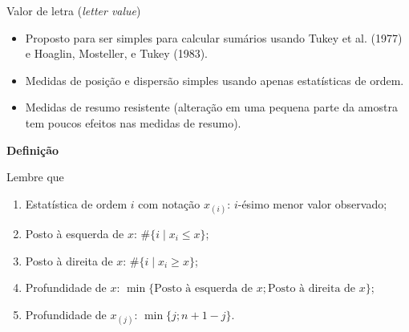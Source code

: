 \documentclass[
  10pt,
  ignorenonframetext,
]{beamer}
\providecommand{\tightlist}{%
  \setlength{\itemsep}{0pt}\setlength{\parskip}{0pt}}\usepackage{longtable,booktabs,array}
\begin{document}
\begin{frame}{Valor de letra (\emph{letter value})}
\protect\hypertarget{valor-de-letra-letter-value}{}
\begin{itemize}
\tightlist
\item
  Proposto para ser simples para calcular sumários usando Tukey et al.
  (1977) e Hoaglin, Mosteller, e Tukey (1983).
\item
  Medidas de posição e dispersão simples usando apenas estatísticas de
  ordem.
\item
  Medidas de resumo resistente (alteração em uma pequena parte da
  amostra tem poucos efeitos nas medidas de resumo).
\end{itemize}

\textbf{Definição}

Lembre que

\begin{enumerate}
\tightlist
\item
  Estatística de ordem \(i\) com notação \(x_{(i)}\): \(i\)-ésimo menor
  valor observado;
\item
  Posto à esquerda de \(x\): \(\#\{i \mid x_i \leq x\}\);
\item
  Posto à direita de \(x\): \(\#\{i \mid x_i \geq x\}\);
\item
  Profundidade de \(x\):
  \(\min\{\text{Posto à esquerda de }x; \text{Posto à direita de }x\}\);
\item
  Profundidade de \(x_{(j)}\): \(\min\{j; n+1-j\}\).
\end{enumerate}
\end{frame}
\end{document}
